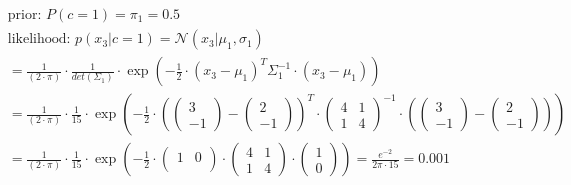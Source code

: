 \documentclass[12pt]{article}
\begin{document}
\begin{enumerate}
\begin{enumerate}[label=\arabic*)]
\begin{itemize}[label=]
            \begin{equation*}
                \begin{aligned}
                    &\text{prior: } P(c=1) = \pi_1 = \mathbf{0.5} \\
                    &\text{likelihood: } p(x_3|c=1) = \mathcal{N}(x_3| \mu_1, \sigma_1) \\
                    &= \frac{1}{(2 \cdot \pi)} \cdot \frac{1}{det(\Sigma_1)} \cdot \exp \left( -\frac{1}{2} \cdot (x_3 - \mu_1)^{T} \Sigma_1^{-1} \cdot (x_3 - \mu_1) \right)\\
                    &= \frac{1}{(2 \cdot \pi)} \cdot \frac{1}{15} \cdot \exp \left( -\frac{1}{2} \cdot \left(\begin{pmatrix}
                    3\\
                    -1
                    \end{pmatrix} - \begin{pmatrix}
                    2\\
                    -1
                    \end{pmatrix}\right)^{T} \cdot \begin{pmatrix}
                    4 & 1\\
                    1 & 4
                    \end{pmatrix}^{-1} \cdot \left(\begin{pmatrix}
                    3\\
                    -1
                    \end{pmatrix} - \begin{pmatrix}
                    2\\
                    -1
                    \end{pmatrix}\right) \right)\\
                    &= \frac{1}{(2 \cdot \pi)} \cdot \frac{1}{15} \cdot \exp \left( -\frac{1}{2} \cdot \begin{pmatrix}
                    1 & 0\\
                    \end{pmatrix} \cdot \begin{pmatrix}
                    4 & 1\\
                    1 & 4
                    \end{pmatrix} \cdot \begin{pmatrix}
                    1\\
                    0
                    \end{pmatrix} \right) = \frac{e^{-2}}{2 \pi \cdot 15} = \mathbf{0.001}\\

\end{aligned}
\end{equation*}
\end{itemize}
\end{enumerate}
\end{enumerate}
\end{document}
